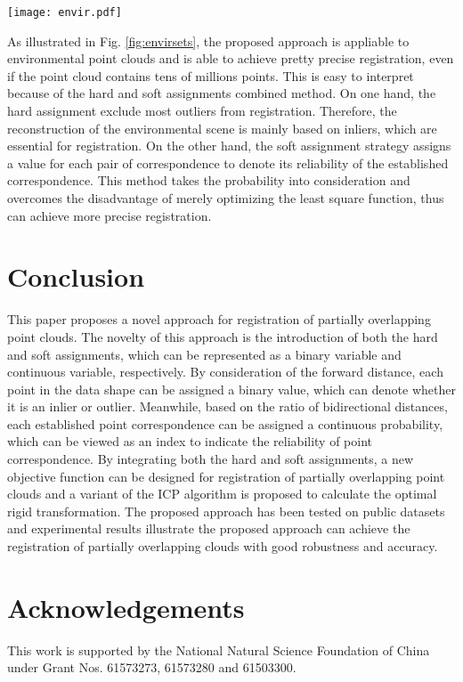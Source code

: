\documentclass[review]{elsarticle}
\begin{document}
\begin{figure*}[!t]
  \centering
  \centerline{\texttt{[image: envir.pdf]}}
%
\caption{Application of the proposed approach to environmental point clouds. (a) Point clouds to be registered. (b) Our results. }\medskip
\label{fig:envirsets}
\end{figure*}







As illustrated in Fig. \ref{fig:envirsets}, the proposed approach is appliable to environmental point clouds and is able to achieve pretty precise registration, even if the point cloud contains tens of millions points. This is easy to interpret because of the hard and soft assignments combined method. On one hand, the hard assignment exclude most outliers from registration. Therefore, the reconstruction of the environmental scene is mainly based on inliers, which are essential for registration. On the other hand, the soft assignment strategy assigns a value for each pair of correspondence to denote its reliability of the established correspondence. This method takes the probability into consideration and overcomes the disadvantage of merely optimizing the least square function, thus can achieve more precise registration.








\section{Conclusion}
This paper proposes a novel approach for registration of partially overlapping point clouds. The novelty of this approach is the introduction of both the hard and soft assignments, which can be represented as a binary variable and continuous variable, respectively. By consideration of the forward distance, each point in the data shape can be assigned a binary value, which can denote whether it is an inlier or outlier. Meanwhile, based on the ratio of bidirectional distances, each established point correspondence can be assigned a continuous probability, which can be viewed as an index to indicate the reliability of point correspondence. By integrating both the hard and soft assignments, a new objective function can be designed for registration of partially overlapping point clouds and a variant of the ICP algorithm is proposed to calculate the optimal rigid transformation. The proposed approach has been tested on public datasets and experimental results illustrate the proposed approach can achieve the registration of partially overlapping clouds with good robustness and accuracy.


\section*{Acknowledgements}

This work is supported by the National Natural Science Foundation of China under Grant Nos. 61573273, 61573280 and 61503300.






\end{document}
